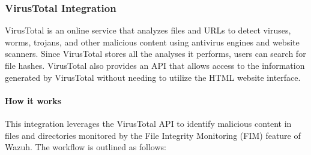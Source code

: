 \subsubsection{VirusTotal Integration}
VirusTotal is an online service that analyzes files and URLs to detect viruses, worms, trojans, and other malicious content using antivirus engines and website scanners. Since VirusTotal stores all the analyses it performs, users can search for file hashes. VirusTotal also provides an API that allows access to the information generated by VirusTotal without needing to utilize the HTML website interface.

\paragraph{How it works}
This integration leverages the VirusTotal API to identify malicious content in files and directories monitored by the File Integrity Monitoring (FIM) feature of Wazuh. The workflow is outlined as follows:

